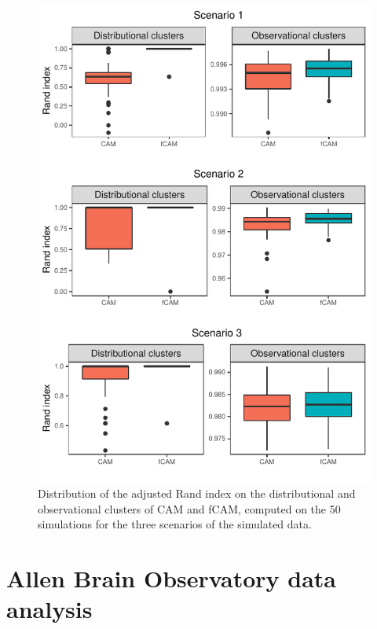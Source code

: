 \begin{figure}
	\centerline{\includegraphics[width = .8\textwidth]{_Images/ch3_Figure_4.pdf}}
	\caption[Comparison between the adjusted Rand index of the fCAM and CAM.]{Distribution of the adjusted Rand index on the distributional and observational clusters of CAM and fCAM, computed on the 50 simulations for the three scenarios of the simulated data.}
	\label{fig:rand_index}
\end{figure}



\section{Allen Brain Observatory data analysis}
\label{s:dataanalysis}

